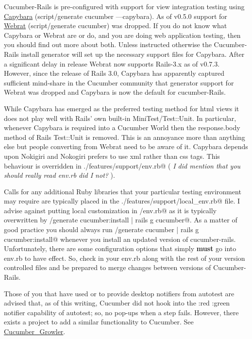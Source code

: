 \documentclass[10pt]{book}
\begin{document}
Cucumber-Rails is pre-configured with support for view integration testing using  \href{http://github.com/jnicklas/capybara}{Capybara} (script/generate  cucumber ---capybara).  As of v0.5.0 support for \href{http://github.com/brynary/webrat}{Webrat} (script/generate cucumber) was dropped. If you do not know what Capybara or Webrat are or do,  and you are doing web application testing, then you should find out more about both.  Unless instructed otherwise the Cucumber-Rails install generator will set up the necessary support files for Capybara.  After a significant delay in release Webrat now supports Rails-3.x as of v0.7.3.  However, since the release of Rails 3.0, Capybara has apparently captured sufficient mind-share in the Cucumber community that generator support for Webrat was dropped and Capybara is now the default for cucumber-Rails.

While Capybara has emerged as the preferred testing method for html views it does not play well with Rails' own built-in MiniTest/Test::Unit.  In particular, whenever Capybara is required into a Cucumber World then the response.body method of Rails Test::Unit is removed.  This is an annoyance more than anything else but people converting from Webrat need to be aware of it.  Capybara depends upon Nokigiri and Nokogiri prefers to use xml rather than css tags.  This behaviour is overridden in \verb@./features/support/env.rb@ ( \emph{I did mention that you should really read env.rb did I not?} ).

Calls for any additional Ruby libraries that your particular testing environment may require are typically placed in the \verb@./features/support/local_env.rb@ file.  I advise against putting local customization in \verb@support/env.rb@ as it is typically overwritten by \verb@script/generate cucumber:install | rails g cucumber@.  As a matter of good practice you should always run \verb@script/generate cucumber | rails g cucumber:install@ whenever you install an updated version of cucumber-rails. Unfortunately, there are some configuration options that simply \textbf{must} go into env.rb to have effect.  So, check in your env.rb along with the rest of your version controlled files and be prepared to merge changes between versions of Cucumber-Rails.

Those of you that have used \verb@growl@ or \verb@snarl@ to provide desktop notifiers from autotest are advised that, as of this writing, Cucumber did not hook into the :red :green notifier capability of autotest;  so, no pop-ups when a step fails.  However, there exists a project to add a similar functionality to Cucumber. See \href{http://github.com/paolodona/cucumber_growler/tree/master}{Cucumber\_Growler}.
\end{document}
